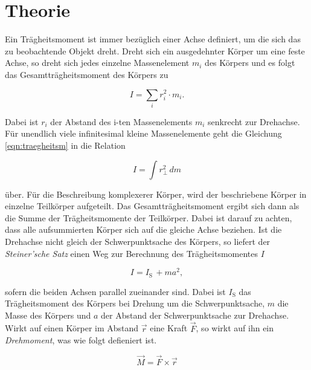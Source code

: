\section{Theorie}
\label{sec:Theorie}

Ein Trägheitsmoment ist immer bezüglich einer Achse definiert, um die sich das zu beobachtende Objekt dreht.
Dreht sich ein ausgedehnter Körper um eine feste Achse, so dreht sich jedes einzelne Massenelement $m_i$ des Körpers
und es folgt das Gesamtträgheitsmoment des Körpers zu

\begin{equation*}
    \label{eqn:traegheitsm}
    I = \sum_i r_i^2 \cdot m_i.
\end{equation*}

\noindent
Dabei ist $r_i$ der Abstand des i-ten Massenelements $m_i$ senkrecht zur Drehachse.
Für unendlich viele infinitesimal kleine Massenelemente geht die Gleichung \autoref{eqn:traegheitsm} in die Relation 

\begin{equation}
    \label{eqn:traegheitsmoment}
    I = \int r_{\perp}^2 \, dm
\end{equation}

\noindent
über.
Für die Beschreibung komplexerer Körper, wird der beschriebene Körper in einzelne Teilkörper aufgeteilt. Das Gesamtträgheitsmoment ergibt
sich dann als die Summe der Trägheitsmomente der Teilkörper. Dabei ist darauf zu achten, dass alle aufsummierten Körper sich auf die 
gleiche Achse beziehen.
Ist die Drehachse nicht gleich der Schwerpunktsache des Körpers, so liefert der \textit{Steiner'sche Satz} einen Weg zur Berechnung des
Trägheitsmomentes $I$

\begin{equation}
    \label{eqn:steiner}
    I = I_{\text{S}} \, + m a^2,
\end{equation}

\noindent
sofern die beiden Achsen parallel zueinander sind.
Dabei ist $I_{\text{S}}$ das Trägheitsmoment des Körpers bei Drehung um die Schwerpunktsache, $m$ die Masse des Körpers und $a$ der 
Abstand der Schwerpunktsache zur Drehachse. 
\noindent
Wirkt auf einen Körper im Abstand $\vec r$ eine Kraft $\vec F$, so wirkt auf ihn ein \textit{Drehmoment}, was wie folgt defieniert ist.

\begin{equation*}
    \label{eqn:drehmoment}
    \vec M = \vec F\times\vec r
\end{equation*}

